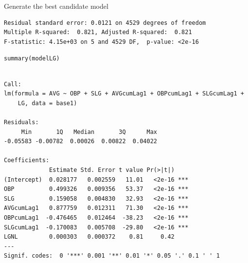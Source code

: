 \documentclass{beamer}\usepackage[]{graphicx}\usepackage[]{color}
\makeatletter
\newcommand{\hlstr}[1]{\textcolor[rgb]{1,0.894,0.71}{#1}}%
\newcommand{\hlopt}[1]{\textcolor[rgb]{1,0.894,0.769}{#1}}%
\newcommand{\hlstd}[1]{\textcolor[rgb]{1,0.894,0.769}{#1}}%
\newcommand{\hlkwb}[1]{\textcolor[rgb]{0.804,0.776,0.451}{#1}}%
\newcommand{\hlkwc}[1]{\textcolor[rgb]{0.78,0.941,0.545}{#1}}%
\newcommand{\hlkwd}[1]{\textcolor[rgb]{1,0.78,0.769}{#1}}%
\newenvironment{kframe}{%
 \def\at@end@of@kframe{}%
 \ifinner\ifhmode%
  \def\at@end@of@kframe{\end{minipage}}%
  \begin{minipage}{\columnwidth}%
 \fi\fi%
 \def\FrameCommand##1{\hskip\@totalleftmargin \hskip-\fboxsep
 \colorbox{shadecolor}{##1}\hskip-\fboxsep
     \hskip-\linewidth \hskip-\@totalleftmargin \hskip\columnwidth}%
 \MakeFramed {\advance\hsize-\width
   \@totalleftmargin\z@ \linewidth\hsize
   \@setminipage}}%
 {\par\unskip\endMakeFramed%
 \at@end@of@kframe}
\newenvironment{knitrout}{}{} %
\makeatother
\begin{document}
\begin{darkframes}
\begin{frame}[fragile]{Generate the best candidate model}
\begin{knitrout}
\begin{kframe}
\begin{verbatim}
Residual standard error: 0.0121 on 4529 degrees of freedom
Multiple R-squared:  0.821,	Adjusted R-squared:  0.821 
F-statistic: 4.15e+03 on 5 and 4529 DF,  p-value: <2e-16
\end{verbatim}
\end{kframe}
\end{knitrout}
    \end{frame}


    \begin{frame}[fragile]
      \fontsize{8}{8}\selectfont
\begin{knitrout}
\begin{kframe}
\begin{alltt}
\hlkwd{summary}\hlstd{(modelLG)}
\end{alltt}
\begin{verbatim}

Call:
lm(formula = AVG ~ OBP + SLG + AVGcumLag1 + OBPcumLag1 + SLGcumLag1 + 
    LG, data = base1)

Residuals:
     Min       1Q   Median       3Q      Max 
-0.05583 -0.00782  0.00026  0.00822  0.04022 

Coefficients:
             Estimate Std. Error t value Pr(>|t|)    
(Intercept)  0.028177   0.002559   11.01   <2e-16 ***
OBP          0.499326   0.009356   53.37   <2e-16 ***
SLG          0.159058   0.004830   32.93   <2e-16 ***
AVGcumLag1   0.877759   0.012311   71.30   <2e-16 ***
OBPcumLag1  -0.476465   0.012464  -38.23   <2e-16 ***
SLGcumLag1  -0.170083   0.005708  -29.80   <2e-16 ***
LGNL         0.000303   0.000372    0.81     0.42    
---
Signif. codes:  0 '***' 0.001 '**' 0.01 '*' 0.05 '.' 0.1 ' ' 1


\end{verbatim}
\end{kframe}
\end{knitrout}
\end{frame}
\end{darkframes}
\end{document}
